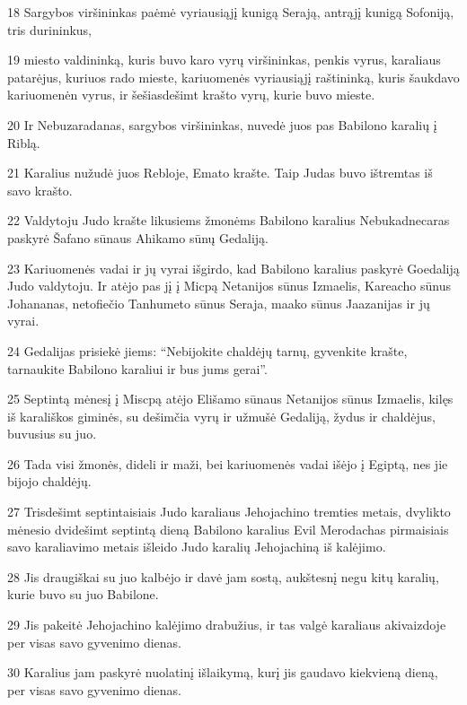 \par 18 Sargybos viršininkas paėmė vyriausiąjį kunigą Serają, antrąjį kunigą Sofoniją, tris durininkus, 
\par 19 miesto valdininką, kuris buvo karo vyrų viršininkas, penkis vyrus, karaliaus patarėjus, kuriuos rado mieste, kariuomenės vyriausiąjį raštininką, kuris šaukdavo kariuomenėn vyrus, ir šešiasdešimt krašto vyrų, kurie buvo mieste. 
\par 20 Ir Nebuzaradanas, sargybos viršininkas, nuvedė juos pas Babilono karalių į Riblą. 
\par 21 Karalius nužudė juos Rebloje, Emato krašte. Taip Judas buvo ištremtas iš savo krašto. 
\par 22 Valdytoju Judo krašte likusiems žmonėms Babilono karalius Nebukadnecaras paskyrė Šafano sūnaus Ahikamo sūnų Gedaliją. 
\par 23 Kariuomenės vadai ir jų vyrai išgirdo, kad Babilono karalius paskyrė Goedaliją Judo valdytoju. Ir atėjo pas jį į Micpą Netanijos sūnus Izmaelis, Kareacho sūnus Johananas, netofiečio Tanhumeto sūnus Seraja, maako sūnus Jaazanijas ir jų vyrai. 
\par 24 Gedalijas prisiekė jiems: “Nebijokite chaldėjų tarnų, gyvenkite krašte, tarnaukite Babilono karaliui ir bus jums gerai”. 
\par 25 Septintą mėnesį į Miscpą atėjo Elišamo sūnaus Netanijos sūnus Izmaelis, kilęs iš karališkos giminės, su dešimčia vyrų ir užmušė Gedaliją, žydus ir chaldėjus, buvusius su juo. 
\par 26 Tada visi žmonės, dideli ir maži, bei kariuomenės vadai išėjo į Egiptą, nes jie bijojo chaldėjų. 
\par 27 Trisdešimt septintaisiais Judo karaliaus Jehojachino tremties metais, dvylikto mėnesio dvidešimt septintą dieną Babilono karalius Evil Merodachas pirmaisiais savo karaliavimo metais išleido Judo karalių Jehojachiną iš kalėjimo. 
\par 28 Jis draugiškai su juo kalbėjo ir davė jam sostą, aukštesnį negu kitų karalių, kurie buvo su juo Babilone. 
\par 29 Jis pakeitė Jehojachino kalėjimo drabužius, ir tas valgė karaliaus akivaizdoje per visas savo gyvenimo dienas. 
\par 30 Karalius jam paskyrė nuolatinį išlaikymą, kurį jis gaudavo kiekvieną dieną, per visas savo gyvenimo dienas.




